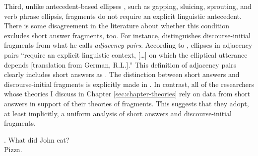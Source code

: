 Third, unlike antecedent-based ellipses \citep{reich2011}, such as gapping, sluicing, sprouting, and verb phrase ellipsis, fragments do not require an explicit linguistic antecedent. There is some disagreement in the literature about whether this condition excludes short answer fragments, too. For instance, \citet{klein1993} distinguishes discourse-initial fragments from what he calls \textit{adjacency pairs}. According to \citet[768]{klein1993}, ellipses in adjacency pairs ``require an explicit linguistic context, [\dots] on which the elliptical utterance depends [translation from German, R.L.].'' This definition of adjacency pairs clearly includes short answers as \Next. The distinction between short answers and discourse-initial fragments is explicitly made in \citet{reich2011}. In contrast, all of the researchers whose theories I discuss in Chapter \ref{sec:chapter-theories} rely on data from short answers in support of their theories of fragments. This suggests that they adopt, at least implicitly, a uniform analysis of short answers and discourse-initial fragments.

\ex. What did John eat?\\
Pizza.

